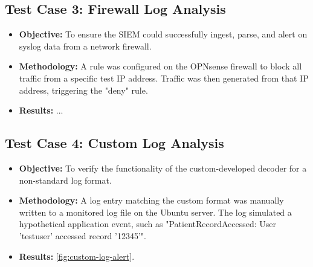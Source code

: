 \subsection{Test Case 3: Firewall Log Analysis}
\begin{itemize}
    \item \textbf{Objective:} To ensure the SIEM could successfully ingest, parse, and alert on syslog data from a network firewall.
    \item \textbf{Methodology:} A rule was configured on the OPNsense firewall to block all traffic from a specific test IP address. Traffic was then generated from that IP address, triggering the "deny" rule.
    \item \textbf{Results:} ...
\end{itemize}
\subsection{Test Case 4: Custom Log Analysis}
\begin{itemize}
    \item \textbf{Objective:} To verify the functionality of the custom-developed decoder for a non-standard log format.
    \item \textbf{Methodology:} A log entry matching the custom format was manually written to a monitored log file on the Ubuntu server. The log simulated a hypothetical application event, such as "PatientRecordAccessed: User 'testuser' accessed record '12345'".
    \item \textbf{Results:} \ref{fig:custom-log-alert}. 
\end{itemize}